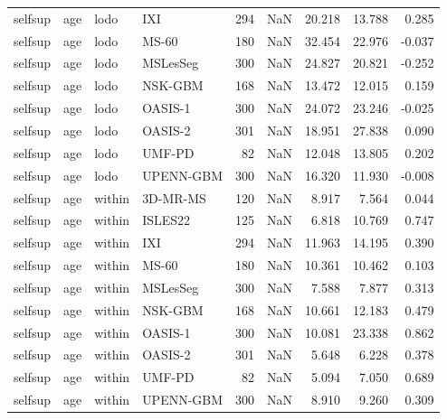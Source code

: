\begin{tabular}{llllrrrrr}
selfsup & age & lodo & IXI & 294 & NaN & 20.218 & 13.788 & 0.285 \\
selfsup & age & lodo & MS-60 & 180 & NaN & 32.454 & 22.976 & -0.037 \\
selfsup & age & lodo & MSLesSeg & 300 & NaN & 24.827 & 20.821 & -0.252 \\
selfsup & age & lodo & NSK-GBM & 168 & NaN & 13.472 & 12.015 & 0.159 \\
selfsup & age & lodo & OASIS-1 & 300 & NaN & 24.072 & 23.246 & -0.025 \\
selfsup & age & lodo & OASIS-2 & 301 & NaN & 18.951 & 27.838 & 0.090 \\
selfsup & age & lodo & UMF-PD & 82 & NaN & 12.048 & 13.805 & 0.202 \\
selfsup & age & lodo & UPENN-GBM & 300 & NaN & 16.320 & 11.930 & -0.008 \\
selfsup & age & within & 3D-MR-MS & 120 & NaN & 8.917 & 7.564 & 0.044 \\
selfsup & age & within & ISLES22 & 125 & NaN & 6.818 & 10.769 & 0.747 \\
selfsup & age & within & IXI & 294 & NaN & 11.963 & 14.195 & 0.390 \\
selfsup & age & within & MS-60 & 180 & NaN & 10.361 & 10.462 & 0.103 \\
selfsup & age & within & MSLesSeg & 300 & NaN & 7.588 & 7.877 & 0.313 \\
selfsup & age & within & NSK-GBM & 168 & NaN & 10.661 & 12.183 & 0.479 \\
selfsup & age & within & OASIS-1 & 300 & NaN & 10.081 & 23.338 & 0.862 \\
selfsup & age & within & OASIS-2 & 301 & NaN & 5.648 & 6.228 & 0.378 \\
selfsup & age & within & UMF-PD & 82 & NaN & 5.094 & 7.050 & 0.689 \\
selfsup & age & within & UPENN-GBM & 300 & NaN & 8.910 & 9.260 & 0.309 \\
\bottomrule
\end{tabular}
